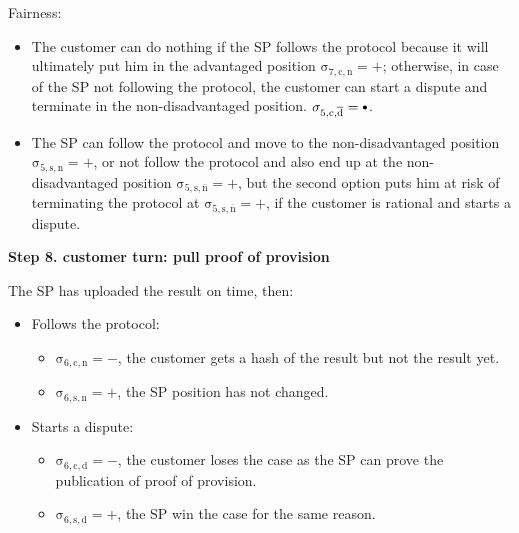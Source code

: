 \documentclass{ieeeaccess}
\newcommand\sbullet[1][.75]{\mathbin{\ThisStyle{\vcenter{\hbox{%
  \scalebox{#1}{$\SavedStyle\bullet$}}}}}%
}
\begin{document}
Fairness:

\begin{itemize}

\item
  The customer can do nothing if the SP follows the protocol because it will ultimately put him in the advantaged position \(\operatorname{\sigma_{7, c, n} = +}\); otherwise, in case of the SP not following the protocol, the customer can start a dispute and terminate in the non-disadvantaged position.
  \(\operatorname{\sigma_{5, c, \overline{d}} = \sbullet}\).
\item
  The SP can follow the protocol and move to the non-disadvantaged position \(\operatorname{\sigma_{5, s, n} = +}\), or not follow the protocol and also end up at the non-disadvantaged position \(\operatorname{\sigma_{5, s, \overline{n}} = +}\), but the second option puts him at risk of terminating the protocol at \(\operatorname{\sigma_{5, s, \overline{n}} = +}\), if the customer is rational and starts a dispute.
\end{itemize}


\noindent \textbf
{Step 8. customer turn: pull proof of provision}\label{step-8-pull-proof-of-provision}

The SP has uploaded the result on time, then:

\begin{itemize}
\item
  Follows the protocol:

  \begin{itemize}
  
  \item
    \(\operatorname{\sigma_{6, c, n} = -}\), the customer gets a hash of the result but not the result yet.
  \item
    \(\operatorname{\sigma_{6, s, n} = +}\), the SP position has not changed.
  \end{itemize}
\item
  Starts a dispute:

  \begin{itemize}
  
  \item
    \(\operatorname{\sigma_{6, c, d} = -}\), the customer loses the case as the SP can prove the publication of proof of provision. 
  \item
    \(\operatorname{\sigma_{6, s, d} = +}\), the SP win the case for the same reason.
  \end{itemize}
\end{itemize}
\end{document}
